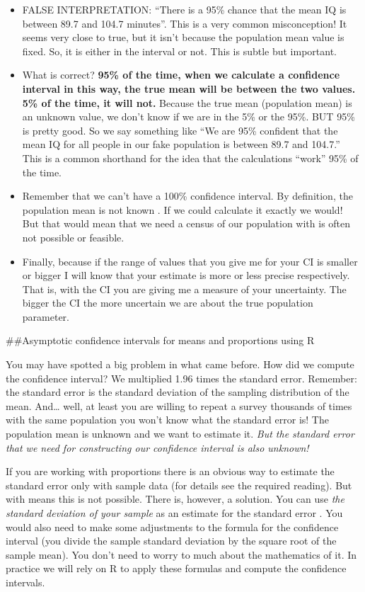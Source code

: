\documentclass[]{book}
\providecommand{\tightlist}{%
  \setlength{\itemsep}{0pt}\setlength{\parskip}{0pt}}
\theoremstyle{definition}
\theoremstyle{definition}
\theoremstyle{definition}
\theoremstyle{remark}
\begin{document}
\begin{itemize}
\tightlist
\item
  FALSE INTERPRETATION: ``There is a 95\% chance that the mean IQ is
  between 89.7 and 104.7 minutes''. This is a very common misconception!
  It seems very close to true, but it isn't because the population mean
  value is fixed. So, it is either in the interval or not. This is
  subtle but important.
\item
  What is correct? \textbf{95\% of the time, when we calculate a
  confidence interval in this way, the true mean will be between the two
  values. 5\% of the time, it will not.} Because the true mean
  (population mean) is an unknown value, we don't know if we are in the
  5\% or the 95\%. BUT 95\% is pretty good. So we say something like
  ``We are 95\% confident that the mean IQ for all people in our fake
  population is between 89.7 and 104.7.'' This is a common shorthand for
  the idea that the calculations ``work'' 95\% of the time.
\item
  Remember that we can't have a 100\% confidence interval. By
  definition, the population mean is not known . If we could calculate
  it exactly we would! But that would mean that we need a census of our
  population with is often not possible or feasible.
\item
  Finally, because if the range of values that you give me for your CI
  is smaller or bigger I will know that your estimate is more or less
  precise respectively. That is, with the CI you are giving me a measure
  of your uncertainty. The bigger the CI the more uncertain we are about
  the true population parameter.
\end{itemize}

\#\#Asymptotic confidence intervals for means and proportions using R

You may have spotted a big problem in what came before. How did we
compute the confidence interval? We multiplied 1.96 times the standard
error. Remember: the standard error is the standard deviation of the
sampling distribution of the mean. And\ldots{} well, at least you are
willing to repeat a survey thousands of times with the same population
you won't know what the standard error is! The population mean is
unknown and we want to estimate it. \emph{But the standard error that we
need for constructing our confidence interval is also unknown!}

If you are working with proportions there is an obvious way to estimate
the standard error only with sample data (for details see the required
reading). But with means this is not possible. There is, however, a
solution. You can use \emph{the standard deviation of your sample} as an
estimate for the standard error . You would also need to make some
adjustments to the formula for the confidence interval (you divide the
sample standard deviation by the square root of the sample mean). You
don't need to worry to much about the mathematics of it. In practice we
will rely on R to apply these formulas and compute the confidence
intervals.
\end{document}
